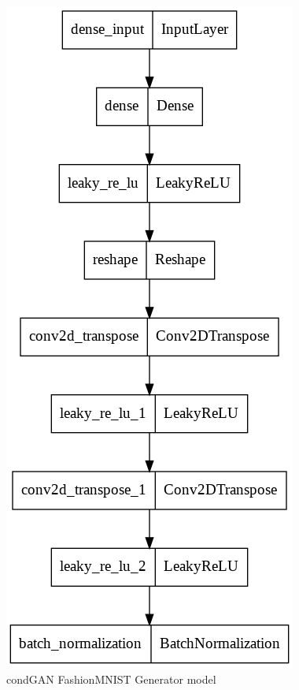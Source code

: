 \documentclass[conference]{IEEEtran}
\begin{document}
\begin{figure}[h]
\centering
\includegraphics[scale = 0.25]{condGAN_gen_model.png}
  \caption{condGAN FashionMNIST Generator model}
\end{figure}\\
\end{document}
